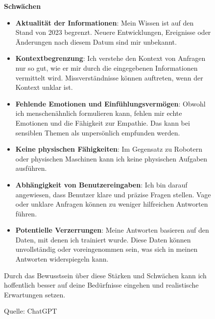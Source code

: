 \begin{figure}
\begin{tcolorbox}[colback=gray!20, colframe=gray!20, boxrule=0pt, sharp corners]
        \textbf{Schwächen}
        \begin{itemize}
            \item \textbf{Aktualität der Informationen}: Mein Wissen ist auf den Stand von 2023 begrenzt. Neuere Entwicklungen, Ereignisse oder Änderungen nach diesem Datum sind mir unbekannt.
            \item \textbf{Kontextbegrenzung}: Ich verstehe den Kontext von Anfragen nur so gut, wie er mir durch die eingegebenen Informationen vermittelt wird. Missverständnisse können auftreten, wenn der Kontext unklar ist.
            \item \textbf{Fehlende Emotionen und Einfühlungsvermögen}: Obwohl ich menschenähnlich formulieren kann, fehlen mir echte Emotionen und die Fähigkeit zur Empathie. Das kann bei sensiblen Themen als unpersönlich empfunden werden.
            \item \textbf{Keine physischen Fähigkeiten}: Im Gegensatz zu Robotern oder physischen Maschinen kann ich keine physischen Aufgaben ausführen.
            \item \textbf{Abhängigkeit von Benutzereingaben}: Ich bin darauf angewiesen, dass Benutzer klare und präzise Fragen stellen. Vage oder unklare Anfragen können zu weniger hilfreichen Antworten führen.
            \item \textbf{Potentielle Verzerrungen}: Meine Antworten basieren auf den Daten, mit denen ich trainiert wurde. Diese Daten können unvollständig oder voreingenommen sein, was sich in meinen Antworten widerspiegeln kann.
        \end{itemize}
    
        Durch das Bewusstsein über diese Stärken und Schwächen kann ich hoffentlich besser auf deine Bedürfnisse eingehen und realistische Erwartungen setzen.
        \vfill
        \end{tcolorbox}
        \caption{Quelle: ChatGPT}
        \label{StäSchwäChatGPT}
    \end{figure}


